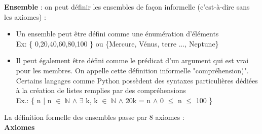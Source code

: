 \textbf{Ensemble} : on peut définir les ensembles de façon informelle (c'est-à-dire sans les axiomes) : \\
\begin{itemize}
\item Un ensemble peut être défini comme une énumération d'éléments \\
Ex: \{ 0,20,40,60,80,100 \} ou \{Mercure, Vénus, terre ..., Neptune\}
\item Il peut également être défini comme le prédicat d'un argument qui est vrai pour les membres. On appelle cette définition informelle "compréhension)". Certains langages comme Python possèdent des syntaxes particulières dédiées à la création de listes remplies par des compréhensions\\
Ex.: \{ n | n $\in$ $\mathbb{N}$ $\wedge$ $\exists$ k, k $\in$ $\mathbb{N}$ $\wedge$ 20k = n $\wedge$ 0 $\leq$ n $\leq$ 100 \} \\
\end{itemize}
La définition formelle des ensembles passe par 8 axiomes :
\\
\textbf{Axiomes} \\

